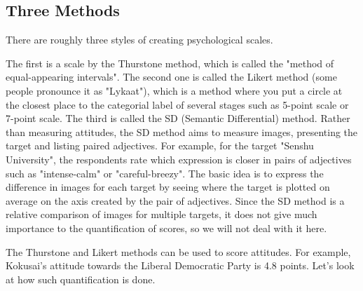\documentclass{ltjsbook}
\begin{document}
\subsection{Three Methods}
There are roughly three styles of creating psychological scales.

The first is a scale by the Thurstone method, which is called the "method of equal-appearing intervals". The second one is called the Likert method (some people pronounce it as "Lykaat"), which is a method where you put a circle at the closest place to the categorial label of several stages such as 5-point scale or 7-point scale. The third is called the SD (Semantic Differential) method. Rather than measuring attitudes, the SD method aims to measure images, presenting the target and listing paired adjectives. For example, for the target "Senshu University", the respondents rate which expression is closer in pairs of adjectives such as "intense-calm" or "careful-breezy". The basic idea is to express the difference in images for each target by seeing where the target is plotted on average on the axis created by the pair of adjectives. Since the SD method is a relative comparison of images for multiple targets, it does not give much importance to the quantification of scores, so we will not deal with it here.

The Thurstone and Likert methods can be used to score attitudes. For example, Kokusai's attitude towards the Liberal Democratic Party is 4.8 points. Let's look at how such quantification is done.
\end{document}
